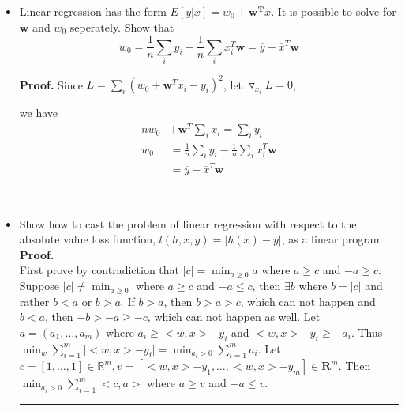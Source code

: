 \documentclass[12pt]{article}%
\newenvironment{proof}[1][Proof]{\textbf{#1.} }{\ \rule{0.5em}{0.5em}}
\begin{document}
\begin{itemize}
	\item Linear regression has the form $E[y\lvert x] = w_{0} + \bm{w^{T}}x$. It is possible to solve for $\bm{w}$ and $w_{0}$ seperately. Show that
	\begin{equation*}
	w_{0} = \frac{1}{n}\sum_{i}y_{i} - \frac{1}{n}\sum_{i}x_{i}^{T}\bm{w} = \overline{y} - \overline{x}^{T}\bm{w} 
	\end{equation*}
	
	\begin{proof}
		Since $L = \sum_{i} (w_0 + \mathbf{w}^Tx_{i} - y_{i})^2$, let $\triangledown_{x_{i}} L = 0$, 
		
		 we have 
		 \begin{align*}
		 nw_0 & + \bm{w}^T \sum_{i} x_i = \sum_{i} y_i \\
		 w_{0} &= \frac{1}{n}\sum_{i}y_{i} - \frac{1}{n}\sum_{i}x_{i}^{T}\bm{w} \\
		 &= \overline{y} - \overline{x}^{T}\bm{w} 
		 \end{align*}
	\end{proof}
	
	
	\item Show how to cast the problem of linear regression with respect to the absolute value loss function, $l(h,x,y)=\lvert h(x) - y \rvert$, as a linear program. \\
	\begin{proof}  \\
		First prove by contradiction that $\lvert c \lvert = \min_{a \geq 0} a$ where $ a \geq c$ and $ -a \geq c $. Suppose $ \lvert c \lvert  \neq \min_{a \geq 0} $ where $ a \geq c$ and $ -a \leq c$, then $ \exists b $ where $ b = \lvert c \lvert $ and rather $ b < a$ or $ b>a$. If $ b>a$, then $b>a>c$, which can not happen and $b<a$, then $-b >-a \geq -c$, which can not happen as well. Let $a=(a_1, \dots, a_m)$ where $a_i \geq <w,x> - y_i $ and $<w,x> - y_i \geq -a_i$. Thus $\min_w \sum_{i=1}^{m} \lvert <w,x> - y_i \lvert = \min_{a_i >0} \sum_{i=1}^{m} a_i$. Let $c=[1, \dots, 1] \in \mathbb{R}^m, v=[<w,x> - y_1, \dots, <w,x>-y_m] \in \mathbf{R}^m$. Then $\min_{a_i >0} \sum_{i=1}^{m} <c,a>$ where $a \geq v$ and $-a \leq v$.
	\end{proof}
	
	
\end{itemize}

\newpage
\end{document}

